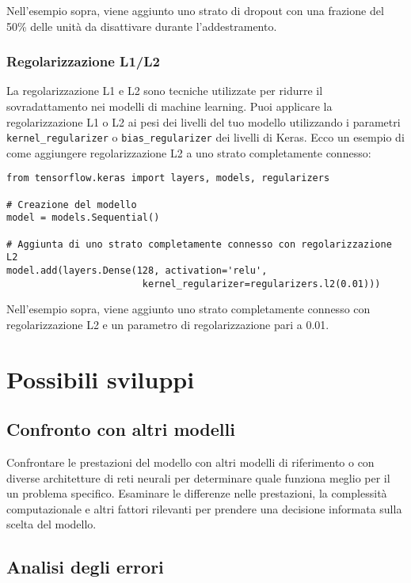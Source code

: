 \documentclass{article}
\begin{document}
Nell'esempio sopra, viene aggiunto uno strato di dropout con una frazione del 50\% delle unità da disattivare durante l'addestramento.

\subsubsection{Regolarizzazione L1/L2}

La regolarizzazione L1 e L2 sono tecniche utilizzate per ridurre il sovradattamento nei modelli di machine learning. Puoi applicare la regolarizzazione L1 o L2 ai pesi dei livelli del tuo modello utilizzando i parametri \texttt{kernel\_regularizer} o \texttt{bias\_regularizer} dei livelli di Keras. Ecco un esempio di come aggiungere regolarizzazione L2 a uno strato completamente connesso:

\begin{verbatim}
from tensorflow.keras import layers, models, regularizers

# Creazione del modello
model = models.Sequential()

# Aggiunta di uno strato completamente connesso con regolarizzazione L2
model.add(layers.Dense(128, activation='relu', 
                        kernel_regularizer=regularizers.l2(0.01)))

\end{verbatim}

Nell'esempio sopra, viene aggiunto uno strato completamente connesso con regolarizzazione L2 e un parametro di regolarizzazione pari a 0.01.

\section{Possibili sviluppi}

\subsection{Confronto con altri modelli}

Confrontare le prestazioni del  modello con altri modelli di riferimento o con diverse architetture di reti neurali per determinare quale funziona meglio per il un problema specifico. Esaminare le differenze nelle prestazioni, la complessità computazionale e altri fattori rilevanti per prendere una decisione informata sulla scelta del modello.

\subsection{Analisi degli errori}
\end{document}
